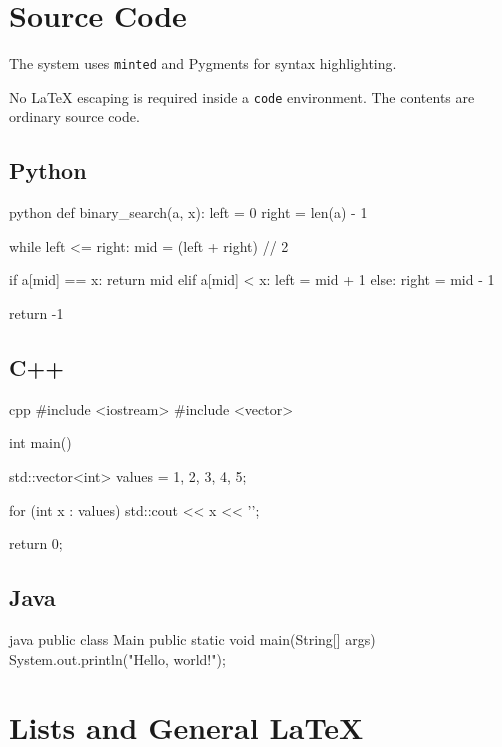 \documentclass{csdept}
\begin{document}
\section{Source Code}

The system uses \texttt{minted} and Pygments for syntax
highlighting.

No LaTeX escaping is required inside a \texttt{code} environment.
The contents are ordinary source code.

\subsection{Python}

\begin{code}{python}
def binary_search(a, x):
    left = 0
    right = len(a) - 1

    while left <= right:
        mid = (left + right) // 2

        if a[mid] == x:
            return mid
        elif a[mid] < x:
            left = mid + 1
        else:
            right = mid - 1

    return -1
\end{code}

\subsection{C++}

\begin{code}{cpp}
#include <iostream>
#include <vector>

int main() {
    std::vector<int> values = {1, 2, 3, 4, 5};

    for (int x : values) {
        std::cout << x << '\n';
    }

    return 0;
}
\end{code}

\subsection{Java}

\begin{code}{java}
public class Main {
    public static void main(String[] args) {
        System.out.println("Hello, world!");
    }
}
\end{code}

\section{Lists and General LaTeX}
\end{document}
